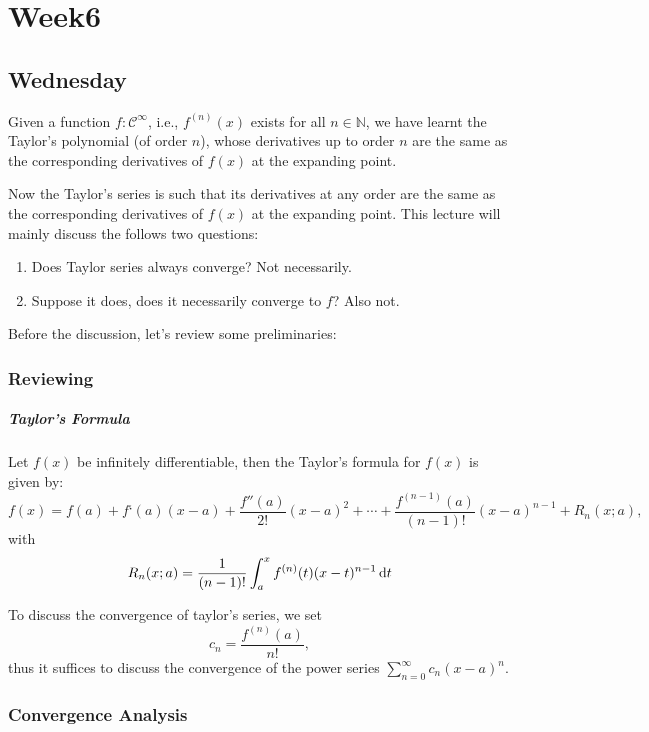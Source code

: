 \chapter{Week6}

\section{Wednesday}
Given a function $f:\mathcal{C}^\infty$, i.e., $f^{(n)}(x)$ exists for all $n\in\mathbb{N}$, we have learnt the Taylor's polynomial (of order $n$), whose derivatives up to order $n$ are the same as the corresponding derivatives of $f(x)$ at the expanding point.

Now the Taylor's series is such that its derivatives at any order are the same as the corresponding derivatives of $f(x)$ at the expanding point. This lecture will mainly discuss the follows two questions:
\begin{enumerate}
\item
Does Taylor series always converge? Not necessarily.
\item
Suppose it does, does it necessarily converge to $f$? Also not.
\end{enumerate}
Before the discussion, let's review some preliminaries:
\subsection{Reviewing}
\paragraph{Taylor's Formula}
\begin{theorem}
Let $f(x)$ be infinitely differentiable, then the Taylor's formula for $f(x)$ is given by:
\[
f(x)=f(a)+f‘(a)(x-a)+\frac{f''(a)}{2!}(x-a)^2+\cdots+\frac{f^{(n-1)}(a)}{(n-1)!}(x-a)^{n-1}+R_n(x;a),
\]
with
\[
R_n(x;a)=\frac{1}{(n-1)!}\int_a^xf^{(n)}(t)(x-t)^{n-1}\,\mathrm{d} t
\]
\end{theorem}
To discuss the convergence of taylor's series, we set
\[
c_n=\frac{f^{(n)}(a)}{n!},
\]
thus it suffices to discuss the convergence of the power series $\sum_{n=0}^\infty c_n(x-a)^n$.
\subsection{Convergence Analysis}
